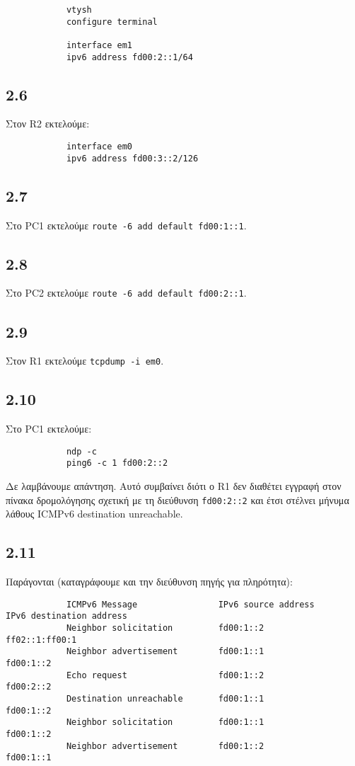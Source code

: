 \documentclass[a4paper, 12pt]{article}
\begin{document}
		\begin{verbatim}
			vtysh
			configure terminal
			
			interface em1
			ipv6 address fd00:2::1/64
		\end{verbatim}

	\subsection*{2.6}
		Στον R2 εκτελούμε:
		
		\begin{verbatim}
			interface em0
			ipv6 address fd00:3::2/126
		\end{verbatim}

	\subsection*{2.7}
		Στο PC1 εκτελούμε \verb|route -6 add default fd00:1::1|.

	\subsection*{2.8}
		Στο PC2 εκτελούμε \verb|route -6 add default fd00:2::1|.

	\subsection*{2.9}
		Στον R1 εκτελούμε \verb|tcpdump -i em0|. 

	\subsection*{2.10}
		Στο PC1 εκτελούμε:
		
		\begin{verbatim}
			ndp -c
			ping6 -c 1 fd00:2::2
		\end{verbatim}
		
		Δε λαμβάνουμε απάντηση. Αυτό συμβαίνει διότι ο R1 δεν διαθέτει εγγραφή στον πίνακα δρομολόγησης σχετική με τη διεύθυνση \verb|fd00:2::2| και έτσι στέλνει μήνυμα λάθους ICMPv6 destination unreachable.

	\subsection*{2.11}
		Παράγονται (καταγράφουμε και την διεύθυνση πηγής για πληρότητα):
		
		\begin{verbatim}
			ICMPv6 Message                IPv6 source address       IPv6 destination address 
			Neighbor solicitation         fd00:1::2                 ff02::1:ff00:1 
			Neighbor advertisement        fd00:1::1                 fd00:1::2
			Echo request                  fd00:1::2                 fd00:2::2
			Destination unreachable       fd00:1::1                 fd00:1::2
			Neighbor solicitation         fd00:1::1                 fd00:1::2
			Neighbor advertisement        fd00:1::2                 fd00:1::1
		\end{verbatim}
\end{document}
